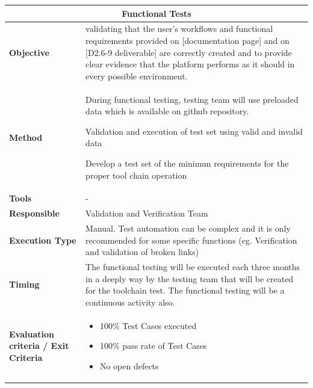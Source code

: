 \begin{center}
\begin{longtable}[H]{|p{4cm}|p{9cm}|}\hline
\multicolumn{2}{|c|}{\textbf{Functional Tests}}\\\hline
\textbf{Objective} &  validating that the user’s workflows and functional requirements provided on \href{https://github.com/openETCS/toolchain/wiki/User-Documentation}[documentation page] and on \href{https://github.com/openETCS/requirements/blob/master/D2.6-9/D2_6-9.pdf}[D2.6-9 deliverable] are correctly created and to provide clear evidence that the platform performs as it should in every possible environment.\\\hline
\textbf{Method} & During functional testing, testing team will use preloaded data which is available on github repository. 

Validation and execution of test set using valid and invalid data

Develop a test set of the minimun requirements for the proper tool chain operation\\\hline
\textbf{Tools} & -\\\hline
\textbf{Responsible} & Validation and Verification Team\\\hline
\textbf{Execution Type} & Manual. Test automation can be complex and it is only recommended for some specific functions (eg. Verification and validation of broken links)\\\hline
\textbf{Timing} & The functional testing will be executed each three months in a deeply way by the testing team that will be created for the toolchain test. The functional testing will be a continuous activity also. \\\hline
\textbf{Evaluation criteria / Exit Criteria} & \begin{itemize}
\item 100\% Test Cases executed
\item 100\% pass rate of Test Cases
\item No open defects
\end{itemize} \\\hline
\end{longtable}
\end{center}

